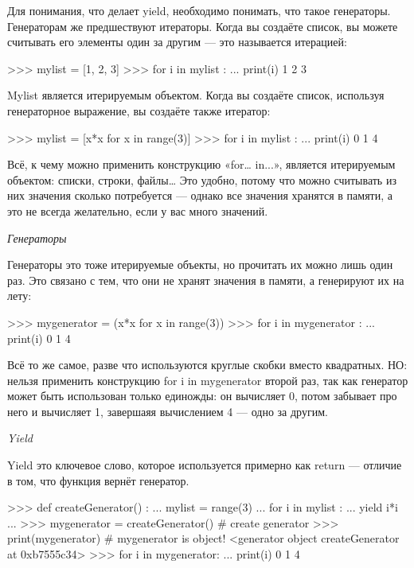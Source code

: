 Для понимания, что делает yield, необходимо понимать, что такое генераторы. Генераторам же предшествуют итераторы. Когда вы создаёте список, вы можете считывать его элементы один за другим — это называется итерацией:

\begin{python}
>>> mylist = [1, 2, 3]
>>> for i in mylist :
...    print(i)
1
2
3
\end{python}

Mylist является итерируемым объектом. Когда вы создаёте список, используя генераторное выражение, вы создаёте также итератор:

\begin{python}
>>> mylist = [x*x for x in range(3)]
>>> for i in mylist :
...    print(i)
0
1
4
\end{python}

Всё, к чему можно применить конструкцию «for… in...», является итерируемым объектом: списки, строки, файлы… Это удобно, потому что можно считывать из них значения сколько потребуется — однако все значения хранятся в памяти, а это не всегда желательно, если у вас много значений.

\textit{Генераторы}

Генераторы это тоже итерируемые объекты, но прочитать их можно лишь один раз. Это связано с тем, что они не хранят значения в памяти, а генерируют их на лету:

\begin{python}
>>> mygenerator = (x*x for x in range(3))
>>> for i in mygenerator :
...    print(i)
0
1
4
\end{python}

Всё то же самое, разве что используются круглые скобки вместо квадратных. НО: нельзя применить конструкцию for i in mygenerator второй раз, так как генератор может быть использован только единожды: он вычисляет 0, потом забывает про него и вычисляет 1, завершаяя вычислением 4 — одно за другим.

\textit{Yield}

Yield это ключевое слово, которое используется примерно как return — отличие в том, что функция вернёт генератор.

\begin{python}
>>> def createGenerator() :
...    mylist = range(3)
...    for i in mylist :
...        yield i*i
...
>>> mygenerator = createGenerator() # create generator
>>> print(mygenerator) # mygenerator is object!
<generator object createGenerator at 0xb7555c34>
>>> for i in mygenerator:
...     print(i)
0
1
4
\end{python}

